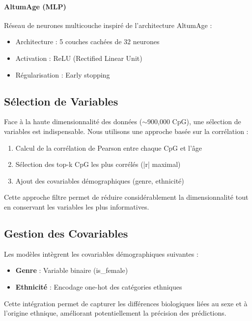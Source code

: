 \documentclass[11pt,a4paper]{article}
\begin{document}
\paragraph{AltumAge (MLP)}
Réseau de neurones multicouche inspiré de l'architecture AltumAge :
\begin{itemize}
    \item Architecture : 5 couches cachées de 32 neurones
    \item Activation : ReLU (Rectified Linear Unit)
    \item Régularisation : Early stopping
\end{itemize}

\subsection{Sélection de Variables}

Face à la haute dimensionnalité des données ($\sim$900,000 CpG), une sélection de variables 
est indispensable. Nous utilisons une approche basée sur la corrélation :

\begin{enumerate}
    \item Calcul de la corrélation de Pearson entre chaque CpG et l'âge
    \item Sélection des top-k CpG les plus corrélés (|r| maximal)
    \item Ajout des covariables démographiques (genre, ethnicité)
\end{enumerate}

Cette approche filtre permet de réduire considérablement la dimensionnalité tout en 
conservant les variables les plus informatives.

\subsection{Gestion des Covariables}

Les modèles intègrent les covariables démographiques suivantes :
\begin{itemize}
    \item \textbf{Genre} : Variable binaire (is\_female)
    \item \textbf{Ethnicité} : Encodage one-hot des catégories ethniques
\end{itemize}

Cette intégration permet de capturer les différences biologiques liées au sexe et à 
l'origine ethnique, améliorant potentiellement la précision des prédictions.
\end{document}
